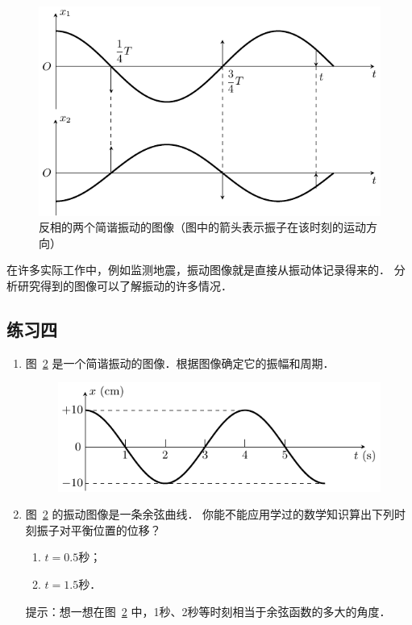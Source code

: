 \begin{figure}[htbp]
    \centering
    \includegraphics{fig/A/9-9.pdf}
    \caption{反相的两个简谐振动的图像（图中的箭头表示振子在该时刻的运动方向）}\label{fig_A_9-9}
\end{figure}

在许多实际工作中，例如监测地震，振动图像就是直接从振动体记录得来的．
分析研究得到的图像可以了解振动的许多情况．


\subsection*{练习四}


\begin{enumerate}
    \item 图~\ref{fig_A_9-10} 是一个简谐振动的图像．根据图像确定它的振幅和周期．
    \begin{figure}[htbp]
    	\centering
    	\includegraphics{fig/A/9-10.pdf}
    	\caption{}\label{fig_A_9-10}
    \end{figure}
    
    \item 图~\ref{fig_A_9-10} 的振动图像是一条余弦曲线．
    你能不能应用学过的数学知识算出下列时刻振子对平衡位置的位移？
    \begin{enumerate}
        \item $t=0.5$秒；
        \item $t=1.5$秒．
    \end{enumerate}

    提示：想一想在图~\ref{fig_A_9-10} 中，1秒、2秒等时刻相当于余弦函数的多大的角度．

\end{enumerate}

